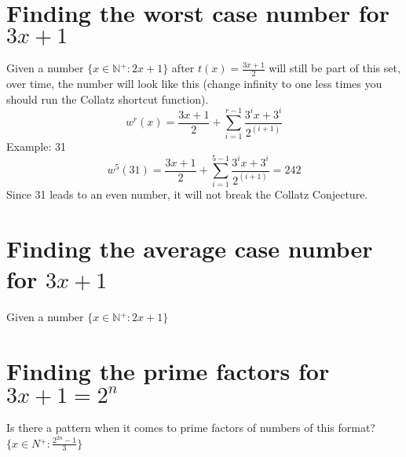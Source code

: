 \documentclass[a4paper,10pt]{article}
\begin{document}
  \section{Finding the worst case number for $3x+1$}
  Given a number \(\{x \in \mathbb{N{^+}}: 2x + 1\}\) after \(t(x) = \frac{3x+1}{2}\) will still be part of this set, over time, the number will look like this (change infinity to one less times you should run the Collatz shortcut function).
  \[
    w^{r}(x) = \frac{3x+1}{2}+\sum_{i=1}^{r-1} \frac{3^{i}x+3^{i}}{2^{(i+1)}}
  \]
  Example: 31
  \[
     w^{5}(31) = \frac{3x+1}{2}+\sum_{i=1}^{5-1} \frac{3^{i}x+3^{i}}{2^{(i+1)}} = 242
  \]
  Since 31 leads to an even number, it will not break the Collatz Conjecture.
  \section{Finding the average case number for $3x+1$}
  Given a number \(\{x \in \mathbb{N{^+}}: 2x + 1\}\)
  \section{Finding the prime factors  for $3x+1=2^n$}
  Is there a pattern when it comes to prime factors of numbers of this format?
  \(\{x \in N{^+} : \frac{2^{2n}-1}{3}\}\)
\end{document}
